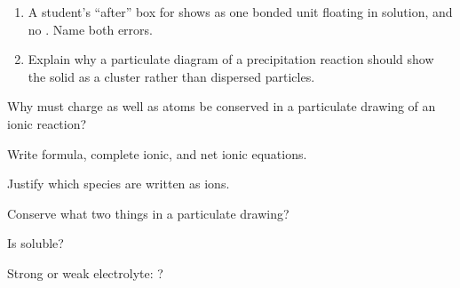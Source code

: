 \documentclass{apchem-notes}
\begin{document}

\begin{enumerate}[leftmargin=*,itemsep=0.4em]
  \item A student's ``after'' box for  shows
         as one bonded unit floating in solution, and no
        . Name both errors.
  \item Explain why a particulate diagram of a precipitation reaction should
        show the solid as a cluster rather than dispersed particles.
\end{enumerate}

\begin{exitticket}
Why must charge as well as atoms be conserved in a particulate drawing of an
ionic reaction? 
\end{exitticket}


\begin{objectives}
  \item Write formula, complete ionic, and net ionic equations.
  \item Justify which species are written as ions.
\end{objectives}


\begin{warmup}[3]
  \item Conserve what two things in a particulate drawing?
  \item Is  soluble? 
  \item Strong or weak electrolyte: ?
\end{warmup}

\end{document}
